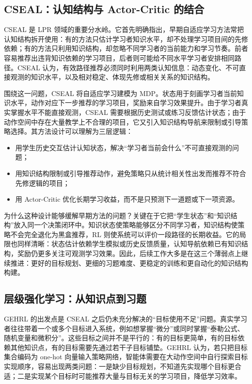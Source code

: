 \documentclass[UTF8,a4paper,zihao=-4]{ctexart}
\begin{document}
\subsection{CSEAL：认知结构与 Actor-Critic 的结合}

CSEAL 是 LPR 领域的重要分水岭。它首先明确指出，早期自适应学习方法常把认知结构拆开使用：有的方法只估计学习者知识水平，却不处理学习项目间的先修依赖；有的方法只利用知识结构，却忽略不同学习者的当前能力和学习节奏。前者容易推荐出违背知识依赖的学习项目，后者则可能给不同水平学习者安排相同路径。CSEAL 认为，有效路径推荐必须同时利用两类认知信息：动态变化、不可直接观测的知识水平，以及相对稳定、体现先修或相关关系的知识结构\cite{Liu2019CSEAL}。

围绕这一问题，CSEAL 将自适应学习建模为 MDP。状态用于刻画学习者当前知识水平，动作对应下一步推荐的学习项目，奖励来自学习效果提升。由于学习者真实掌握水平不能直接观测，CSEAL 需要根据历史测试或练习反馈估计状态；由于动作空间中存在大量教学上不合理的项目，它又引入知识结构导航来限制或引导策略选择。其方法设计可以理解为三层逻辑：
\begin{itemize}
  \item 用学生历史交互估计认知状态，解决“学习者当前会什么”不可直接观测的问题；
  \item 用知识结构限制或引导推荐动作，避免策略只从统计相关性出发而推荐不符合先修逻辑的项目；
  \item 用 Actor-Critic 优化长期学习收益，而不是只预测下一道题或下一项资源。
\end{itemize}
为什么这种设计能够缓解早期方法的问题？关键在于它把“学生状态”和“知识结构”放入同一个决策闭环中。知识状态使策略能够区分不同学习者，知识结构使策略不会完全退化为黑盒推荐，RL 则使系统可以评价一段路径的长期收益。它的局限也同样清晰：状态估计依赖学生模拟或历史反馈质量，认知导航依赖已有知识结构，奖励仍更多关注可观测学习效果。因此，后续工作大多是在这三个薄弱点上继续推进：更好的目标规划、更细的习题难度、更稳定的训练和更自动化的知识结构构建。

\subsection{层级强化学习：从知识点到习题}

GEHRL 的出发点是 CSEAL 之后仍未充分解决的“目标使用不足”问题。真实学习者往往带着一个或多个目标进入系统，例如想掌握“微分”或同时掌握“泰勒公式、随机变量和微积分”。这些目标之间并不是平行的：有的目标更简单，有的目标依赖其他知识点，有的目标需要先通过若干子目标铺垫。GEHRL 认为，若只把目标集合编码为 one-hot 向量输入策略网络，智能体需要在大动作空间中自行探索目标实现顺序，容易出现两类问题：一是缺少目标规划，不知道先实现哪个目标更合适；二是实现某个目标时可能推荐大量与目标无关的学习项目，降低学习效率\cite{Li2023GEHRL}。
\end{document}
